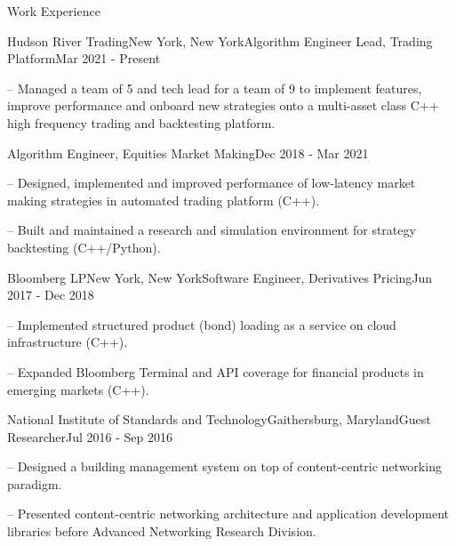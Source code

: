 \documentclass{resume} %
\begin{document}

\begin{rSection}{Work Experience}

\begin{rSubsection}{Hudson River Trading}{New York, New York}{Algorithm Engineer Lead, Trading Platform}{Mar 2021 - Present}

\item[--] Managed a team of 5 and tech lead for a team of 9 to implement features, improve performance and onboard new strategies onto a multi-asset class C++ high frequency trading and backtesting platform.

\end{rSubsection}
\vspace{-5mm}
\begin{rSubsection}{}{}{Algorithm Engineer, Equities Market Making}{Dec 2018 - Mar 2021}

\item[--] Designed, implemented and improved performance of low-latency market making strategies in automated trading platform (C++).
\item[--] Built and maintained a research and simulation environment for strategy backtesting (C++/Python). 

\end{rSubsection}

\begin{rSubsection}{Bloomberg LP}{New York, New York}{Software Engineer, Derivatives Pricing}{Jun 2017 - Dec 2018}
\item[--] Implemented structured product (bond) loading as a service on cloud infrastructure (C++).
\item[--] Expanded Bloomberg Terminal and API coverage for financial products in emerging markets (C++).
\end{rSubsection}

\begin{rSubsection}{National Institute of Standards and Technology}{Gaithersburg, Maryland}{Guest Researcher}{Jul 2016 - Sep 2016}
\item[--] Designed a building management system on top of content-centric networking paradigm.
\item[--] Presented content-centric networking architecture and application development libraries before Advanced Networking Research Division.
\end{rSubsection}


\end{rSection}
\end{document}
